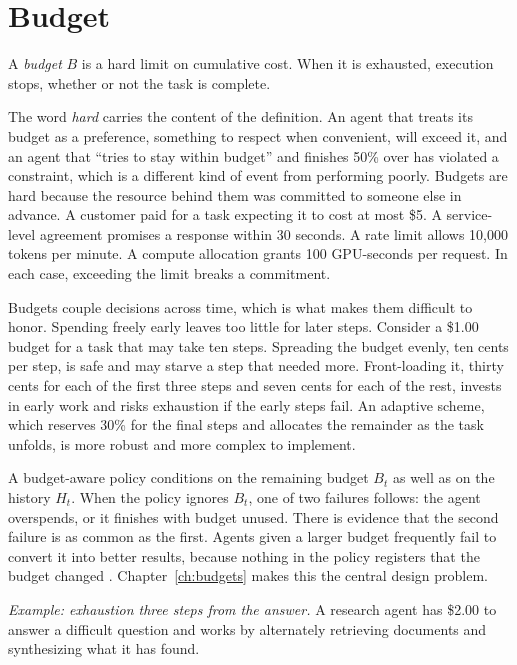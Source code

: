 \documentclass[11pt]{book}
\begin{document}
\section{Budget}

A \emph{budget} $B$ is a hard limit on cumulative cost. When it is exhausted, execution stops, whether or not the task is complete.

The word \textit{hard} carries the content of the definition. An agent that treats its budget as a preference, something to respect when convenient, will exceed it, and an agent that ``tries to stay within budget'' and finishes 50\% over has violated a constraint, which is a different kind of event from performing poorly. Budgets are hard because the resource behind them was committed to someone else in advance. A customer paid for a task expecting it to cost at most \$5. A service-level agreement promises a response within 30 seconds. A rate limit allows 10{,}000 tokens per minute. A compute allocation grants 100 GPU-seconds per request. In each case, exceeding the limit breaks a commitment.

Budgets couple decisions across time, which is what makes them difficult to honor. Spending freely early leaves too little for later steps. Consider a \$1.00 budget for a task that may take ten steps. Spreading the budget evenly, ten cents per step, is safe and may starve a step that needed more. Front-loading it, thirty cents for each of the first three steps and seven cents for each of the rest, invests in early work and risks exhaustion if the early steps fail. An adaptive scheme, which reserves 30\% for the final steps and allocates the remainder as the task unfolds, is more robust and more complex to implement.

A budget-aware policy conditions on the remaining budget $B_t$ as well as on the history $H_t$. When the policy ignores $B_t$, one of two failures follows: the agent overspends, or it finishes with budget unused. There is evidence that the second failure is as common as the first. Agents given a larger budget frequently fail to convert it into better results, because nothing in the policy registers that the budget changed \cite{budgettooluse2026}. Chapter~\ref{ch:budgets} makes this the central design problem.

\textit{Example: exhaustion three steps from the answer.} A research agent has \$2.00 to answer a difficult question and works by alternately retrieving documents and synthesizing what it has found.
\end{document}

